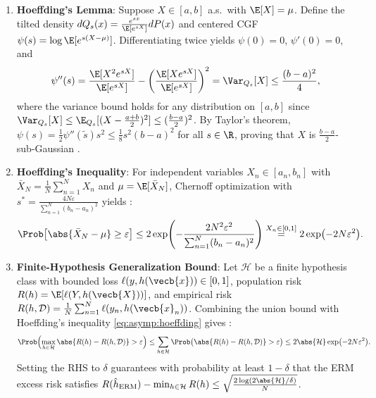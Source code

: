 \documentclass[../../../../master.tex]{subfiles}
\begin{document}
\begin{coremath}
\begin{enumerate}
  \item \textbf{Hoeffding's Lemma}: Suppose $X \in [a, b]$ a.s.\ with $\E[X] = \mu$. Define the tilted density $dQ_s(x) = \frac{e^{sx}}{\E[e^{sX}]} dP(x)$ and centered CGF $\psi(s) = \log \E[e^{s(X-\mu)}]$. Differentiating twice yields $\psi(0) = 0$, $\psi'(0) = 0$, and
  \begin{equation}
  \psi''(s) = \frac{\E[X^2 e^{sX}]}{\E[e^{sX}]} - \left(\frac{\E[X e^{sX}]}{\E[e^{sX}]}\right)^2 = \Var_{Q_s}[X] \le \frac{(b-a)^2}{4},
  \end{equation}
  where the variance bound holds for any distribution on $[a, b]$ since $\Var_{Q_s}[X] \le \E_{Q_s}[(X - \frac{a+b}{2})^2] \le (\frac{b-a}{2})^2$. By Taylor's theorem, $\psi(s) = \frac{1}{2}\psi''(\tilde{s}) s^2 \le \frac{1}{8}s^2(b-a)^2$ for all $s \in \R$, proving that $X$ is $\frac{b-a}{2}$-sub-Gaussian .
  \item \textbf{Hoeffding's Inequality}: For independent variables $X_n \in [a_n, b_n]$ with $\bar{X}_N = \frac{1}{N}\sum_{n=1}^N X_n$ and $\mu = \E[\bar{X}_N]$, Chernoff optimization with $s^* = \frac{4N\varepsilon}{\sum_{n=1}^N (b_n - a_n)^2}$ yields :
  \begin{equation}
  \label{eq:asymp:hoeffding}
  \Prob\bigl[\abs{\bar{X}_N - \mu} \ge \varepsilon\bigr] \le 2\exp\!\left(-\frac{2N^2\varepsilon^2}{\sum_{n=1}^N (b_n - a_n)^2}\right) \stackrel{X_n \in [0,1]}{=} 2\exp\bigl(-2N\varepsilon^2\bigr).
  \end{equation}
  \item \textbf{Finite-Hypothesis Generalization Bound}: Let $\mathcal{H}$ be a finite hypothesis class with bounded loss $\ell(y, h(\vecb{x})) \in [0, 1]$, population risk $R(h) = \E[\ell(Y, h(\vecb{X}))]$, and empirical risk $R(h, \mathcal{D}) = \frac{1}{N}\sum_{n=1}^N \ell(y_n, h(\vecb{x}_n))$. Combining the union bound  with Hoeffding's inequality \eqref{eq:asymp:hoeffding} gives :
  \begin{equation}
  \label{eq:asymp:pac}
  \Prob\Bigl(\max_{h \in \mathcal{H}} \abs{R(h) - R(h,\mathcal{D})} > \varepsilon\Bigr) \le \sum_{h \in \mathcal{H}} \Prob\bigl(\abs{R(h) - R(h,\mathcal{D})} > \varepsilon\bigr) \le 2\abs{\mathcal{H}}\exp\bigl(-2N\varepsilon^2\bigr).
  \end{equation}
  Setting the RHS to $\delta$ guarantees with probability at least $1-\delta$ that the ERM excess risk satisfies $R(\hat{h}_{\mathrm{ERM}}) - \min_{h\in\mathcal{H}} R(h) \le \sqrt{\frac{2\log(2\abs{\mathcal{H}}/\delta)}{N}}$.
\end{enumerate}
\end{coremath}
\end{document}
